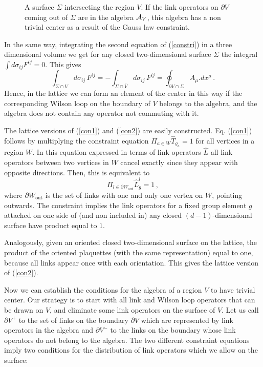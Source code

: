 \documentclass[12pt,a4paper]{article}
\newcommand{\be}{\begin{equation}}
\newcommand{\ee}{\end{equation}}
\def\be{\begin{equation}}
\def\ee{\end{equation}}
\begin{document}
\begin{figure}
\centering
\leavevmode
\epsfysize=5cm
\bigskip
\caption{A surface $\Sigma$ intersecting the region $V$. If the link operators on $\partial V$ coming out of $\Sigma$ are in the algebra ${\cal A}_V$, this algebra has a non trivial center as a result of the Gauss law constraint.}
\label{gauss}
\end{figure}


In the same way, integrating the second equation of (\ref{constri}) in a three dimensional volume we get for any closed two-dimensional surface $\Sigma$ the integral $\int d\sigma_{ij} F^{ij}=0$. 
This gives
\be 
\int_{\Sigma\cap V} d \sigma_{ij}\,F^{ij}=-\int_{\Sigma\cap \bar{V}} d \sigma_{ij}\,F^{ij}=\oint_{\partial V\cap \Sigma} A_\mu.dx^\mu\,.\label{con2}
\ee 
Hence, in the lattice we can form an element of the center in this way if the corresponding Wilson loop on the boundary of $V$ belongs to the algebra,  and the algebra does not 
contain any operator not commuting with it. 

The lattice versions of (\ref{con1}) and (\ref{con2}) are easily constructed. Eq. (\ref{con1}) follows by multiplying the constraint 
equation $\Pi_{a\in W} \hat{T}_{g_a}=1$ for all vertices in a region $W$. In this equation expressed in terms of link operators $\hat{L}$ all 
link operators between two vertices in $W$ cancel exactly since they appear with opposite directions. Then, this is equivalent to 
\be
\Pi_{l \in \partial W_{\textrm{out}}} \hat{L}^l_g=1\,,
\ee
where $\partial W_{\textrm{out}}$ is the set of links with one and only one vertex on $W$, pointing outwards. The constraint implies the 
link operators for a fixed group element $g$ attached on one side of (and non included in) any closed $(d-1)$-dimensional surface have product equal to $1$. 

Analogously, given an oriented closed two-dimensional surface on the lattice, the product of the oriented plaquettes (with the same representation)
equal to one, because all links appear once with each orientation. This gives the lattice version of (\ref{con2}). 

Now we can establish the conditions for the algebra of a region $V$ to have trivial center. 
Our strategy is to start with all link and Wilson loop operators  
that can be drawn on $V$, and eliminate some link operators on the surface of $V$. 
Let us call $\partial V^+$ to the set of links on the 
boundary $\partial V$ which are represented by link operators in the algebra and $\partial V^-$ to the links on the boundary whose link operators 
do not belong to the algebra. The two different constraint equations imply two conditions for the distribution of link operators which we allow on the surface:
\end{document}
